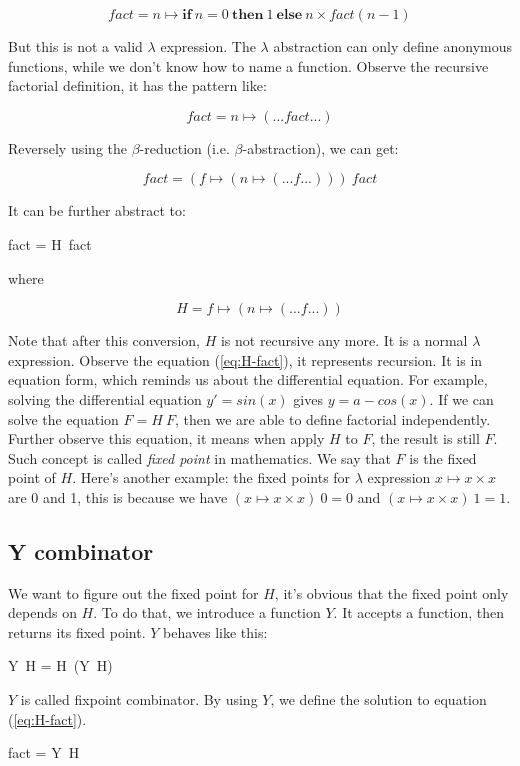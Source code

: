 \documentclass[b5paper]{article}
\begin{document}
\[
fact = n \mapsto \textbf{if}\ n = 0\ \textbf{then}\ 1\ \textbf{else}\ n \times fact (n - 1)
\]

But this is not a valid $\lambda$ expression. The $\lambda$ abstraction can only define anonymous functions, while we don't know how to name a function. Observe the recursive factorial definition, it has the pattern like:

\[
fact = n \mapsto (... fact ...)
\]

Reversely using the $\beta$-reduction (i.e. $\beta$-abstraction), we can get:

\[
fact = (f \mapsto (n \mapsto (... f ...)))\ fact
\]

It can be further abstract to:

\be
fact = H\ fact
\label{eq:H-fact}
\ee

where

\[
H = f \mapsto (n \mapsto (... f ...))
\]

Note that after this conversion, $H$ is not recursive any more. It is a normal $\lambda$ expression. Observe the equation (\ref{eq:H-fact}), it represents recursion. It is in equation form, which reminds us about the differential equation. For example, solving the differential equation $y' = sin(x)$ gives $y = a - cos(x)$. If we can solve the equation $F = H\ F$, then we are able to define factorial independently. Further observe this equation, it means when apply $H$ to $F$, the result is still $F$. Such concept is called {\em fixed point} in mathematics. We say that $F$ is the fixed point of $H$. Here's another example: the fixed points for $\lambda$ expression $x \mapsto x \times x$ are 0 and 1, this is because we have $(x \mapsto x \times x)\ 0 = 0$ and $(x \mapsto x \times x)\ 1 = 1$.

\subsection{Y combinator}

We want to figure out the fixed point for $H$, it's obvious that the fixed point only depends on $H$. To do that, we introduce a function $Y$. It accepts a function, then returns its fixed point. $Y$ behaves like this:

\be
Y\ H = H\ (Y\ H)
\label{eq:Y-H}
\ee

$Y$ is called fixpoint combinator. By using $Y$, we define the solution to equation (\ref{eq:H-fact}).

\be
fact = Y\ H
\label{eq:fact-in-Y}
\ee
\end{document}
